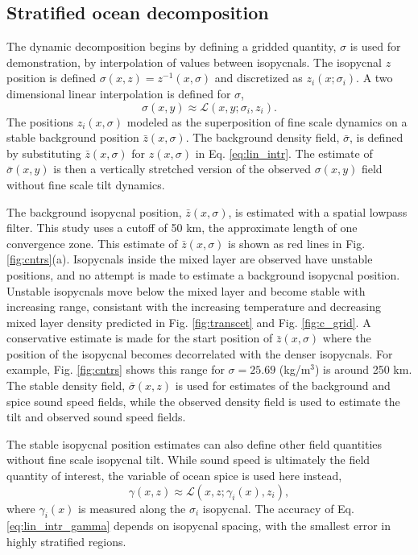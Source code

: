 \documentclass[preprint,NumberedRefs]{JASA}
\begin{document}
\subsection{Stratified ocean decomposition}
The dynamic decomposition begins by defining a gridded quantity, $\sigma$ is used for demonstration, by interpolation of values between isopycnals. The isopycnal $z$ position is defined $\sigma(x, z) = z^{-1}(x, \sigma)$ and discretized as $z_i(x; \sigma_i)$. A two dimensional linear interpolation is defined for $\sigma$,
\begin{equation}
    \sigma(x,y)\approx\mathcal{L}(x, y; \sigma_i, z_i).
    \label{eq:lin_intr}
\end{equation}
The positions $z_i(x, \sigma)$ modeled as the superposition of fine scale dynamics on a stable background position $\bar{z}(x, \sigma)$. The background density field, $\bar{\sigma}$, is defined by substituting $\bar{z}(x, \sigma)$ for $z(x, \sigma)$ in Eq. \eqref{eq:lin_intr}. The estimate of $\bar{\sigma}(x,y)$ is then a vertically stretched version of the observed $\sigma(x,y)$ field without fine scale tilt dynamics.

The background isopycnal position, $\bar{z}(x, \sigma)$, is estimated with a spatial lowpass filter. This study uses a cutoff of 50 km, the approximate length of one convergence zone. This estimate of $\bar{z}(x, \sigma)$ is shown as red lines in Fig. \ref{fig:cntrs}(a). Isopycnals inside the mixed layer are observed have unstable positions, and no attempt is made to estimate a background isopycnal position. Unstable isopycnals move below the mixed layer and become stable with increasing range, consistant with the increasing temperature and decreasing mixed layer density predicted in Fig. \ref{fig:transcet} and Fig. \ref{fig:c_grid}. A conservative estimate is made for the start position of $\bar{z}(x, \sigma)$ where the position of the isopycnal becomes decorrelated with the denser isopycnals. For example, Fig. \ref{fig:cntrs} shows this range for $\sigma=25.69$ (kg/m$^3$) is around 250 km. The stable density field, $\bar{\sigma}(x,z)$ is used for estimates of the background and spice sound speed fields, while the observed density field is used to estimate the tilt and observed sound speed fields.

The stable isopycnal position estimates can also define other field quantities without fine scale isopycnal tilt. While sound speed is ultimately the field quantity of interest, the variable of ocean spice is used here instead,
\begin{equation}
    \gamma(x, z)\approx\mathcal{L}(x, z; \gamma_i(x), z_i),
    \label{eq:lin_intr_gamma}
\end{equation}
where $\gamma_i(x)$ is measured along the $\sigma_i$ isopycnal. The accuracy of Eq. \eqref{eq:lin_intr_gamma} depends on isopycnal spacing, with the smallest error in highly stratified regions.
\end{document}
